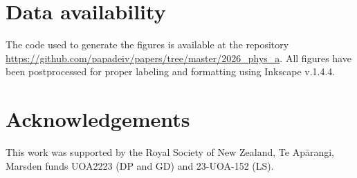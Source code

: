 \documentclass[a4paper,fleqn]{cas-sc}
\begin{document}
\section*{Data availability}
The code used to generate the figures is available at the repository \url{https://github.com/papadeiv/papers/tree/master/2026_phys_a}.
All figures have been postprocessed for proper labeling and formatting using Inkscape v.1.4.4.
%
\section*{Acknowledgements}
This work was supported by the Royal Society of New Zealand, Te Ap\={a}rangi, Marsden funds UOA2223 (DP and GD) and 23-UOA-152 (LS).
%


\end{document}
